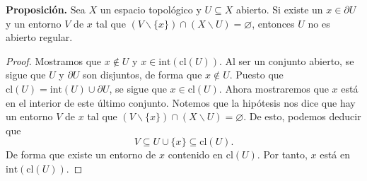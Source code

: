 \documentclass{article}
\begin{document}
\textbf{Proposición. } Sea $X$ un espacio topológico y $U \subseteq X$ abierto. Si existe un $x \in \partial U$ y un entorno $V$ de $x$ tal que $(V \backslash \{x\}) \cap (X \backslash U) = \varnothing$, entonces $U$ no es abierto regular. 
\begin{proof}
	Mostramos que $x \notin U$ y $x \in \text{int}(\text{cl}(U))$. Al ser un conjunto abierto, se sigue que $U$ y $\partial U$ son disjuntos, de forma que $x \notin U$. Puesto que $\text{cl}(U) = \text{int}(U) \cup \partial U$, se sigue que $x \in \text{cl}(U)$. Ahora mostraremos que $x$ está en el interior de este último conjunto. Notemos que la hipótesis nos dice que hay un entorno $V$ de $x$ tal que $(V \backslash \{x\}) \cap (X \backslash U) = \varnothing$. De esto, podemos deducir que
	$$ V \subseteq U \cup \{ x \} \subseteq \text{cl}(U). $$
	De forma que existe un entorno de $x$ contenido en $\text{cl}(U)$. Por tanto, $x$ está en  $\text{int}(\text{cl}(U))$.
\end{proof}
\end{document}
